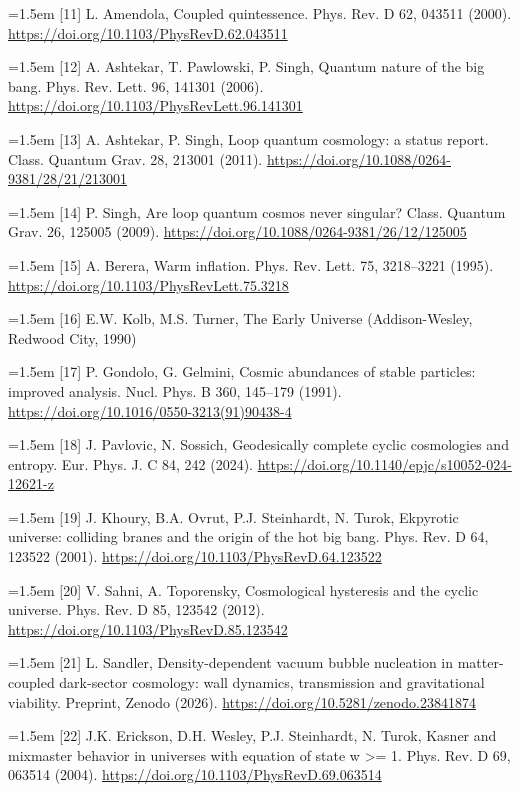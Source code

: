 \documentclass[11pt,a4paper]{article}
\begin{document}
\noindent\hangindent=1.5em [11] L. Amendola, Coupled quintessence. Phys. Rev. D 62, 043511 (2000). \url{https://doi.org/10.1103/PhysRevD.62.043511}\par
\noindent\hangindent=1.5em [12] A. Ashtekar, T. Pawlowski, P. Singh, Quantum nature of the big bang. Phys. Rev. Lett. 96, 141301 (2006). \url{https://doi.org/10.1103/PhysRevLett.96.141301}\par
\noindent\hangindent=1.5em [13] A. Ashtekar, P. Singh, Loop quantum cosmology: a status report. Class. Quantum Grav. 28, 213001 (2011). \url{https://doi.org/10.1088/0264-9381/28/21/213001}\par
\noindent\hangindent=1.5em [14] P. Singh, Are loop quantum cosmos never singular? Class. Quantum Grav. 26, 125005 (2009). \url{https://doi.org/10.1088/0264-9381/26/12/125005}\par
\noindent\hangindent=1.5em [15] A. Berera, Warm inflation. Phys. Rev. Lett. 75, 3218--3221 (1995). \url{https://doi.org/10.1103/PhysRevLett.75.3218}\par
\noindent\hangindent=1.5em [16] E.W. Kolb, M.S. Turner, The Early Universe (Addison-Wesley, Redwood City, 1990)\par
\noindent\hangindent=1.5em [17] P. Gondolo, G. Gelmini, Cosmic abundances of stable particles: improved analysis. Nucl. Phys. B 360, 145--179 (1991). \url{https://doi.org/10.1016/0550-3213(91)90438-4}\par
\noindent\hangindent=1.5em [18] J. Pavlovic, N. Sossich, Geodesically complete cyclic cosmologies and entropy. Eur. Phys. J. C 84, 242 (2024). \url{https://doi.org/10.1140/epjc/s10052-024-12621-z}\par
\noindent\hangindent=1.5em [19] J. Khoury, B.A. Ovrut, P.J. Steinhardt, N. Turok, Ekpyrotic universe: colliding branes and the origin of the hot big bang. Phys. Rev. D 64, 123522 (2001). \url{https://doi.org/10.1103/PhysRevD.64.123522}\par
\noindent\hangindent=1.5em [20] V. Sahni, A. Toporensky, Cosmological hysteresis and the cyclic universe. Phys. Rev. D 85, 123542 (2012). \url{https://doi.org/10.1103/PhysRevD.85.123542}\par
\noindent\hangindent=1.5em [21] L. Sandler, Density-dependent vacuum bubble nucleation in matter-coupled dark-sector cosmology: wall dynamics, transmission and gravitational viability. Preprint, Zenodo (2026). \url{https://doi.org/10.5281/zenodo.23841874}\par
\noindent\hangindent=1.5em [22] J.K. Erickson, D.H. Wesley, P.J. Steinhardt, N. Turok, Kasner and mixmaster behavior in universes with equation of state w >= 1. Phys. Rev. D 69, 063514 (2004). \url{https://doi.org/10.1103/PhysRevD.69.063514}\par
\end{document}
